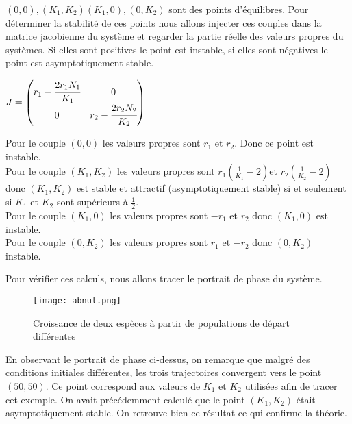 \documentclass[11pt]{article}
\begin{document}
$(0,0),(K_1,K_2)(K_1,0),(0,K_2)$ sont des points d'équilibres.
Pour déterminer la stabilité de ces points nous allons injecter ces couples dans la matrice jacobienne du système et regarder la partie réelle des valeurs propres du systèmes. Si elles sont positives le point est instable, si elles sont négatives le point est asymptotiquement stable.
\begin{center}
\begin{math}
J = 
\begin{pmatrix} 
r_1 - \cfrac{2r_1N_1}{K_1}  & 0 \\
0   & r_2 - \cfrac{2r_2N_2}{K_2}   \\
\end{pmatrix}
\end{math}
\end{center}
Pour le couple $(0,0)$ les valeurs propres sont $r_1$ et $r_2$. Donc ce point est instable. \\
Pour le couple $(K_1,K_2)$ les valeurs propres sont $r_1(\frac{1}{K_1} - 2) $et  $r_2(\frac{1}{K_2} - 2) $ donc
$(K_1,K_2)$ est stable et attractif (asymptotiquement stable) si et seulement si $K_1$ et $K_2$ sont supérieurs à $\frac{1}{2}$.\\
Pour le couple $(K_1,0)$ les valeurs propres sont $-r_1 $ et  $r_2$ donc 
$(K_1,0)$ est instable.\\
Pour le couple $(0,K_2)$ les valeurs propres sont $r_1 $ et  $-r_2$ donc 
$(0,K_2)$ instable.

Pour vérifier ces calculs, nous allons tracer le portrait de phase du système.
\begin{center}
\begin{figure}[H]
    \centering
    \texttt{[image: abnul.png]}
    \caption{Croissance de deux espèces à partir de populations de départ différentes}
    \label{0}
\end{figure}
\end{center}

En observant le portrait de phase ci-dessus, on remarque que malgré des conditions initiales différentes, les trois trajectoires convergent vers le point $(50,50)$. Ce point correspond aux valeurs de $K_1$ et $K_2$ utilisées afin de tracer cet exemple. On avait précédemment calculé que le point $(K_1,K_2)$ était asymptotiquement stable. On retrouve bien ce résultat ce qui confirme la théorie.
\end{document}
